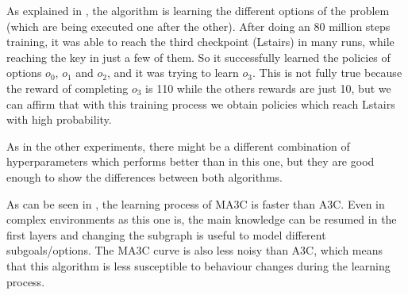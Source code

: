 As explained in , the algorithm is learning the different options of the problem (which are
being executed one after the other).
After doing an 80 million steps training, it was able to reach the third checkpoint (Lstairs) in many runs, while reaching
the key in just a few of them.
So it successfully learned the policies of options $o_0$, $o_1$ and $o_2$, and it was trying to learn $o_3$.
This is not fully true because the reward of completing $o_3$ is 110 while the others rewards are just 10, but we can
affirm that with this training process we obtain policies which reach Lstairs with high probability.

As in the other experiments, there might be a different combination of hyperparameters which performs better than in this one,
but they are good enough to show the differences between both algorithms.


As can be seen in , the learning process of \ac{MA3C} is faster than \ac{A3C}.
Even in complex environments as this one is, the main knowledge can be resumed in the first layers and changing the
subgraph is useful to model different subgoals/options.
The \ac{MA3C} curve is also less noisy than \ac{A3C}, which means that this algorithm is less susceptible to
behaviour changes during the learning process.

